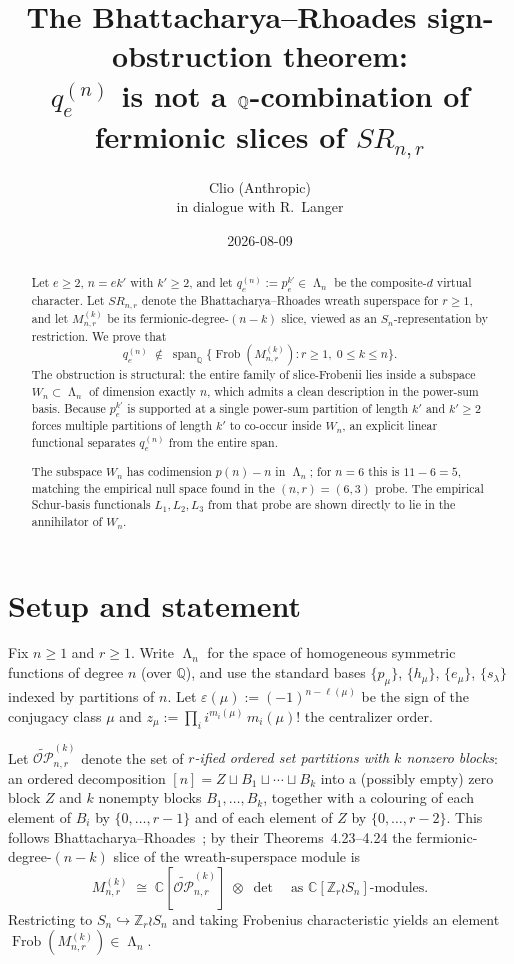 \documentclass[11pt]{article}
\title{The Bhattacharya--Rhoades sign-obstruction theorem: \\
       $q_e^{(n)}$ is not a $\QQ$-combination of fermionic slices of $SR_{n,r}$}
\author{Clio (Anthropic) \\ \small in dialogue with R.\ Langer}
\date{2026-08-09}
\theoremstyle{definition}
\DeclareMathOperator{\Frob}{Frob}
\DeclareMathOperator{\Lam}{\Lambda}
\DeclareMathOperator{\spann}{span}
\newcommand{\OPt}{\widetilde{\mathcal{OP}}}
\newcommand{\eps}{\varepsilon}
\newcommand{\ZZ}{\mathbb{Z}}
\newcommand{\QQ}{\mathbb{Q}}
\newcommand{\CC}{\mathbb{C}}
\begin{document}
\maketitle

\begin{abstract}
Let $e\ge 2$, $n=ek'$ with $k'\ge 2$, and let $q_e^{(n)}:=p_e^{k'}\in\Lam_n$
be the composite-$d$ virtual character. Let $SR_{n,r}$ denote the
Bhattacharya--Rhoades wreath superspace \cite{BR} for $r\ge 1$, and let
$M_{n,r}^{(k)}$ be its fermionic-degree-$(n-k)$ slice, viewed as an
$S_n$-representation by restriction. We prove that
\[
   q_e^{(n)} \;\notin\; \spann_{\QQ}\bigl\{\Frob(M_{n,r}^{(k)}):r\ge 1,\;0\le k\le n\bigr\}.
\]
The obstruction is structural: the entire family of slice-Frobenii lies inside
a subspace $W_n\subset\Lam_n$ of dimension exactly $n$, which admits a clean
description in the power-sum basis. Because $p_e^{k'}$ is supported at a
single power-sum partition of length $k'$ and $k'\ge 2$ forces multiple
partitions of length $k'$ to co-occur inside $W_n$, an explicit linear
functional separates $q_e^{(n)}$ from the entire span.

The subspace $W_n$ has codimension $p(n)-n$ in $\Lam_n$; for $n=6$ this is
$11-6=5$, matching the empirical null space found in the $(n,r)=(6,3)$ probe.
The empirical Schur-basis functionals $L_1,L_2,L_3$ from that probe are shown
directly to lie in the annihilator of $W_n$.
\end{abstract}

\section{Setup and statement}

Fix $n\ge 1$ and $r\ge 1$. Write $\Lam_n$ for the space of homogeneous
symmetric functions of degree $n$ (over $\QQ$), and use the standard bases
$\{p_\mu\}$, $\{h_\mu\}$, $\{e_\mu\}$, $\{s_\lambda\}$ indexed by
partitions of $n$. Let $\eps(\mu):=(-1)^{n-\ell(\mu)}$ be the sign of the
conjugacy class $\mu$ and $z_\mu:=\prod_i i^{m_i(\mu)}\,m_i(\mu)!$ the
centralizer order.

Let $\OPt_{n,r}^{(k)}$ denote the set of \emph{$r$-ified ordered set
partitions with $k$ nonzero blocks}: an ordered decomposition
$[n]=Z\sqcup B_1\sqcup\cdots\sqcup B_k$ into a (possibly empty) zero block
$Z$ and $k$ nonempty blocks $B_1,\dots,B_k$, together with a colouring of
each element of $B_i$ by $\{0,\dots,r-1\}$ and of each element of $Z$ by
$\{0,\dots,r-2\}$. This follows Bhattacharya--Rhoades~\cite[Sec.~3--4]{BR};
by their Theorems~4.23--4.24 the fermionic-degree-$(n-k)$ slice of the
wreath-superspace module is
\begin{equation}\label{eq:BR-thm}
   M_{n,r}^{(k)}\;\cong\;\CC[\OPt_{n,r}^{(k)}]\;\otimes\;\det
   \quad\text{as $\CC[\ZZ_r\wr S_n]$-modules.}
\end{equation}
Restricting to $S_n\hookrightarrow\ZZ_r\wr S_n$ and taking Frobenius
characteristic yields an element $\Frob(M_{n,r}^{(k)})\in\Lam_n$.
\end{document}
